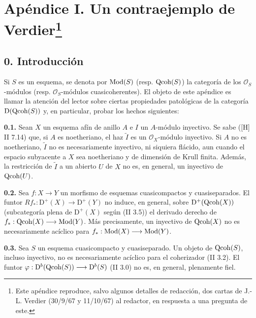 \providecommand{\sisi}[2]{#2}

\section*{Apéndice I. Un contraejemplo de Verdier\protect\footnote{Este apéndice reproduce, salvo algunos detalles de redacción, dos cartas de J.-L. Verdier (30/9/67 y 11/10/67) al redactor, en respuesta a una pregunta de este.}}

\subsection*{0. Introducción}
Si $S$ es un esquema, se denota por $\operatorname{Mod}(S)$ (resp. $\operatorname{Qcoh}(S)$) la categoría de los $\mathcal O_S$-módulos (resp. $\mathcal O_S$-módulos cuasicoherentes). El objeto de este apéndice es llamar la atención del lector sobre ciertas propiedades patológicas de la categoría $\mathrm D(\operatorname{Qcoh}(S))$ y, en particular, probar los hechos siguientes:

\textbf{0.1.} Sean $X$ un esquema afín de anillo $A$ e $I$ un $A$-módulo inyectivo. Se sabe ([H] II 7.14) que, si $A$ es noetheriano, el haz $\widetilde I$ es un $\mathcal O_X$-módulo inyectivo. Si $A$ no es noetheriano, $\widetilde I$ no es necesariamente inyectivo, ni siquiera flácido, aun cuando el espacio subyacente a $X$ sea noetheriano y de dimensión de Krull finita. Además, la restricción de $\widetilde I$ a un abierto $U$ de $X$ no es, en general, un inyectivo de $\operatorname{Qcoh}(U)$.

\textbf{0.2.} Sea $f:X\longrightarrow Y$ un morfismo de esquemas cuasicompactos y cuasiseparados. El funtor $Rf_*:\mathrm D^+(X)\longrightarrow\mathrm D^+(Y)$ no induce, en general, sobre $\mathrm D^+(\operatorname{Qcoh}(X))$ (subcategoría plena de $\mathrm D^+(X)$ según (II 3.5)) el derivado derecho de $f_*:\operatorname{Qcoh}(X)\longrightarrow\operatorname{Mod}(Y)$. Más precisamente, un inyectivo de $\operatorname{Qcoh}(X)$ no es necesariamente acíclico para $f_*:\operatorname{Mod}(X)\longrightarrow\operatorname{Mod}(Y)$.

\textbf{0.3.} Sea $S$ un esquema cuasicompacto y cuasiseparado. Un objeto de $\operatorname{Qcoh}(S)$, incluso inyectivo, no es necesariamente acíclico para el coherizador (II 3.2). El funtor $\varphi:\mathrm D^b(\operatorname{Qcoh}(S))\longrightarrow\mathrm D^b(S)$ (II 3.0) no es, en general, plenamente fiel.

